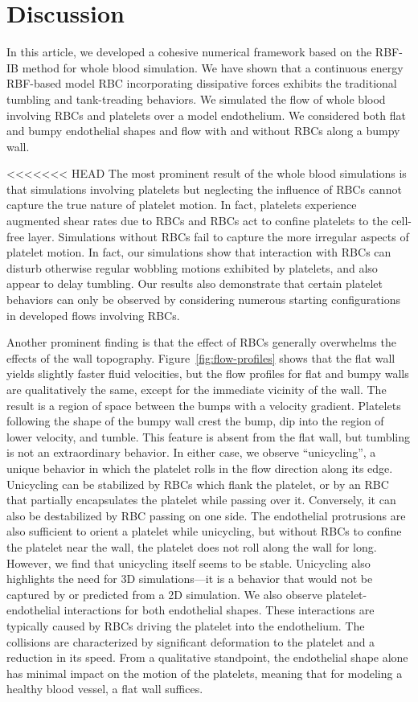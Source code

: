 \section{Discussion}\label{sec:conclusion}

In this article, we developed a cohesive numerical framework based on the RBF-IB method
for whole blood simulation. We have shown that a continuous energy RBF-based model RBC
incorporating dissipative forces exhibits the traditional tumbling and tank-treading
behaviors. We simulated the flow of whole blood involving RBCs and platelets over a model
endothelium. We considered both flat and bumpy endothelial shapes and flow with and
without RBCs along a bumpy wall.

<<<<<<< HEAD
The most prominent result of the whole blood simulations is that simulations involving
platelets but neglecting the influence of RBCs cannot capture the true nature of platelet
motion.  In fact, platelets experience augmented shear rates due to RBCs and RBCs act to
confine platelets to the cell-free layer. Simulations without RBCs fail to capture the
more irregular aspects of platelet motion. In fact, our simulations show that interaction
with RBCs can disturb otherwise regular wobbling motions exhibited by platelets, and also
appear to delay tumbling. Our results also demonstrate that certain platelet behaviors
can only be observed by considering numerous starting configurations in developed flows
involving RBCs.

Another prominent finding is that the effect of RBCs generally overwhelms the effects of
the wall topography. Figure~\ref{fig:flow-profiles} shows that the flat wall yields
slightly faster fluid velocities, but the flow profiles for flat and bumpy walls are
qualitatively the same, except for the immediate vicinity of the wall. The result is a
region of space between the bumps with a velocity gradient. Platelets following the shape
of the bumpy wall crest the bump, dip into the region of lower velocity, and tumble. This
feature is absent from the flat wall, but tumbling is not an extraordinary behavior. In
either case, we observe ``unicycling'', a unique behavior in which the platelet rolls in
the flow direction along its edge. Unicycling can be stabilized by RBCs which flank the
platelet, or by an RBC that partially encapsulates the platelet while passing over it.
Conversely, it can also be destabilized by RBC passing on one side.  The endothelial
protrusions are also sufficient to orient a platelet while unicycling, but without RBCs
to confine the platelet near the wall, the platelet does not roll along the wall for
long. However, we find that unicycling itself seems to be stable. Unicycling also
highlights the need for 3D simulations---it is a behavior that would not be captured by
or predicted from a 2D simulation. We also observe platelet-endothelial interactions for
both endothelial shapes. These interactions are typically caused by RBCs driving the
platelet into the endothelium. The collisions are characterized by significant
deformation to the platelet and a reduction in its speed. From a qualitative standpoint,
the endothelial shape alone has minimal impact on the motion of the platelets, meaning
that for modeling a healthy blood vessel, a flat wall suffices.

